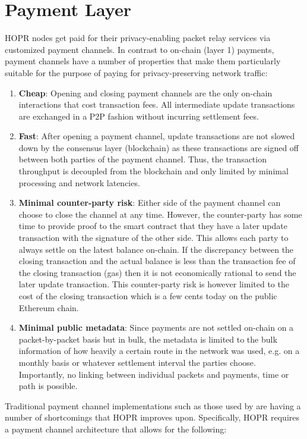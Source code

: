 \section{Payment Layer} \label{PaymentLayer}
HOPR nodes get paid for their privacy-enabling packet relay services via customized payment channels. In contrast to on-chain (layer 1) payments, payment channels have a number of properties that make them particularly suitable for the purpose of paying for privacy-preserving network traffic:

\begin{enumerate}
    \item \textbf{Cheap}: Opening and closing payment channels are the only on-chain interactions that cost transaction fees. All intermediate update transactions are exchanged in a P2P fashion without incurring settlement fees.
    \item \textbf{Fast}: After opening a payment channel, update transactions are not slowed down by the consensus layer (blockchain) as these transactions are signed off between both parties of the payment channel. Thus, the transaction throughput is decoupled from the blockchain and only limited by minimal processing and network latencies.
    \item \textbf{Minimal counter-party risk}: Either side of the payment channel can choose to close the channel at any time. However, the counter-party has some time to provide proof to the smart contract that they have a later update transaction with the signature of the other side. This allows each party to always settle on the latest balance on-chain. If the discrepancy between the closing transaction and the actual balance is less than the transaction fee of the closing transaction (gas) then it is not economically rational to send the later update transaction. This counter-party risk is however limited to the cost of the closing transaction which is a few cents today on the public Ethereum chain.
    \item \textbf{Minimal public metadata}: Since payments are not settled on-chain on a packet-by-packet basis but in bulk, the metadata is limited to the bulk information of how heavily a certain route in the network was used, e.g. on a monthly basis or whatever settlement interval the parties choose. Importantly, no linking between individual packets and payments, time or path is possible.
\end{enumerate}

\noindent Traditional payment channel implementations such as those used by  are having a number of shortcomings that HOPR improves upon. Specifically, HOPR requires a payment channel architecture that allows for the following:

